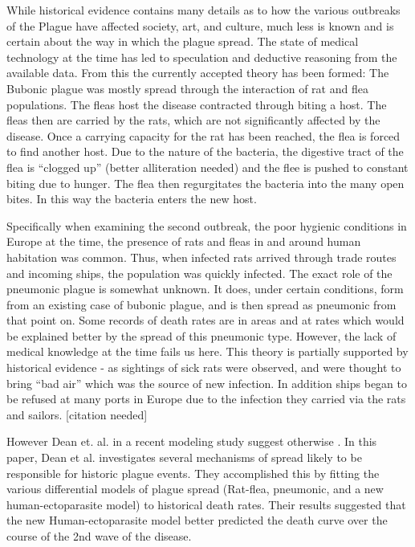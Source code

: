 \documentclass [letterpaper, 12pt] {article}
\begin{document}
While historical evidence contains many details as to how the various outbreaks of the Plague have affected society, art, and culture, much less is known and is certain about the way in which the plague spread. The state of medical technology at the time has led to speculation and deductive reasoning from the available data. From this the currently accepted theory has been formed: The Bubonic plague was mostly spread through the interaction of rat and flea populations. The fleas host the disease contracted through biting a host. The fleas then are carried by the rats, which are not significantly affected by the disease. Once a carrying capacity for the rat has been reached, the flea is forced to find another host. Due to the nature of the bacteria, the digestive tract of the flea is “clogged up” (better alliteration needed) and the flee is pushed to constant biting due to hunger. The flea then regurgitates the bacteria into the many open bites. In this way the bacteria enters the new host. 

Specifically when examining the second outbreak, the poor hygienic conditions in Europe at the time, the presence of rats and fleas in and around human habitation was common. Thus, when infected rats arrived through trade routes and incoming ships, the population was quickly infected.
The exact role of the pneumonic plague is somewhat unknown. It does, under certain conditions, form from an existing case of bubonic plague, and is then spread as pneumonic from that point on. Some records of death rates are in areas and at rates which would be explained better by the spread of this pneumonic type. However, the lack of medical knowledge at the time fails us here.
This theory is partially supported by historical evidence - as sightings of sick rats were observed, and were thought to bring “bad air” which was the source of new infection. In addition ships began to be refused at many ports in Europe due to the infection they carried via the rats and sailors. [citation needed]

However Dean et. al. in a recent modeling study suggest otherwise \cite{Dean1304}. In this paper, Dean et al. investigates several mechanisms of spread likely to be responsible for historic plague events. They accomplished this by fitting the various differential models of plague spread (Rat-flea, pneumonic, and  a new human-ectoparasite model) to historical death rates. Their results suggested that the new Human-ectoparasite model better predicted the death curve over the course of the 2nd wave of the disease.
\end{document}
